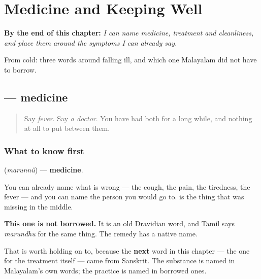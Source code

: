 
\chapter{Medicine and Keeping Well}
\label{ch:ml-medicine}

\begin{chapteropening}
\textbf{By the end of this chapter:} \emph{I can name medicine, treatment and cleanliness, and place them around the symptoms I can already say.}

From cold: three words around falling ill, and which one Malayalam did not have to borrow.
\end{chapteropening}

\section[\texorpdfstring{\ml{മരുന്ന്} (marunnŭ)}{മരുന്ന് (marunnŭ)}]{ — medicine}

\label{lesson:ML-C107-marunnu}



\begin{quote}
Say \emph{fever}. Say \emph{a doctor}. You have had both for a long while, and nothing at all to put between them.
\end{quote}

\subsection*{What to know first}
\textbf{} (\emph{marunnŭ}) — \textbf{medicine}.

You can already name what is wrong — the cough, the pain, the tiredness, the fever — and you can name the person you would go to. \textbf{} is the thing that was missing in the middle.

\begin{culture}
\textbf{This one is not borrowed.} It is an old Dravidian word, and Tamil says \emph{marundhu} for the same thing. The remedy has a native name.

That is worth holding on to, because the \textbf{next} word in this chapter — the one for the treatment itself — came from Sanskrit. The substance is named in Malayalam's own words; the practice is named in borrowed ones.
\end{culture}

